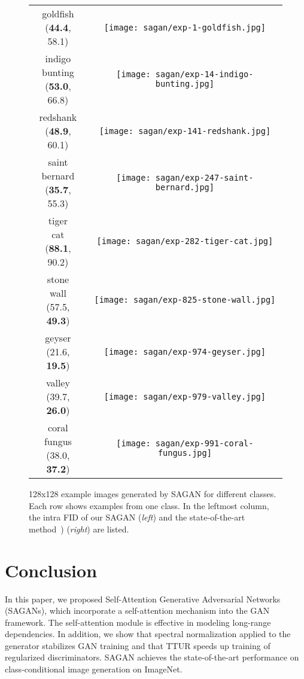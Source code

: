 \documentclass{article}
\begin{document}
\begin{figure*}[tb]
    \centering
    \small
    \begin{tabular}{cc}
     \shortstack{goldfish \\ ({\bf44.4}, 58.1)} &\texttt{[image: sagan/exp-1-goldfish.jpg]}\\
    \shortstack{indigo \\bunting \\ ({\bf53.0}, 66.8)} &\texttt{[image: sagan/exp-14-indigo-bunting.jpg]}\\
    \shortstack{redshank \\ ({\bf48.9}, 60.1)} &\texttt{[image: sagan/exp-141-redshank.jpg]}\\
    \shortstack{saint \\bernard \\({\bf35.7}, 55.3)} &\texttt{[image: sagan/exp-247-saint-bernard.jpg]}\\
    \shortstack{tiger \\cat \\({\bf88.1}, 90.2)} &\texttt{[image: sagan/exp-282-tiger-cat.jpg]}\\
    \shortstack{stone \\wall \\(57.5, {\bf49.3})} &\texttt{[image: sagan/exp-825-stone-wall.jpg]}\\
\shortstack{geyser \\(21.6, {\bf19.5})} &\texttt{[image: sagan/exp-974-geyser.jpg]}\\
    \shortstack{valley \\(39.7, {\bf26.0})} &\texttt{[image: sagan/exp-979-valley.jpg]}\\
\shortstack{coral \\fungus \\ (38.0, {\bf37.2})} &\texttt{[image: sagan/exp-991-coral-fungus.jpg]}\\
    \end{tabular}
\caption{128x128 example images generated by SAGAN for different classes. Each row shows examples from one class. In the leftmost column, the intra FID of our SAGAN (\emph{left}) and the state-of-the-art method~\cite{Miyato18b}) (\emph{right}) are listed. }
\label{fig:fish}
 \end{figure*}
\section{Conclusion}\label{sec:sagan_conclude}
In this paper, we proposed Self-Attention Generative Adversarial Networks (SAGANs), which incorporate a self-attention mechanism into the GAN framework.
The self-attention module is effective in modeling long-range dependencies.
In addition, we show that spectral normalization applied to the generator stabilizes GAN training and that TTUR speeds up training of regularized discriminators.
SAGAN achieves the state-of-the-art performance on class-conditional image generation on ImageNet.
\clearpage
\end{document}
